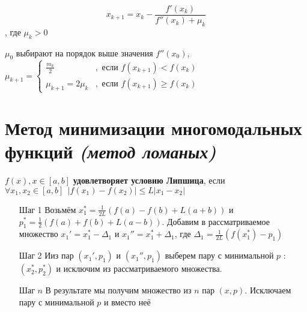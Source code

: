 \[x_{k+1} = x_k - \frac{f'(x_k)}{f''(x_k) + \mu_k} \]
, где \(\mu_k > 0\)

\(\mu_0\) выбирают на порядок выше значения \(f''(x_0)\), \(\mu_{k + 1} = \begin{cases} \frac{m_k}{2} & , \text{ если } f(x_{k+1}) < f(x_k) \\ \mu_{k+1} = 2 \mu_k & , \text{ если } f(x_{k+1}) \geq f(x_k) \end{cases}\)

\section{Метод минимизации многомодальных функций \textit{(метод ломаных)}}

\begin{definition}
    \(f(x), x\in[a, b]\) \textbf{удовлетворяет условию Липшица}, если \(\forall x_1, x_2\in[a, b] \ \ |f(x_1) - f(x_2)| \leq L |x_1 - x_2|\)
\end{definition}

\begin{itemize}
    \item [Шаг 1] Возьмём \(x_1^* = \frac{1}{2L}(f(a) - f(b) + L(a + b))\) и \(p_1^* = \frac{1}{2}(f(a) + f(b) + L(a - b))\). Добавим в рассматриваемое множество \(x_1' = x_1^* - \Delta_1\) и \(x_1'' = x_1^* + \Delta_1\), где \(\Delta_1 = \frac{1}{2L} (f(x_1^*) - p_1)\)
    \item [Шаг 2] Ииз пар \((x_1', p_1)\) и \((x_1'', p_1)\) выберем пару с минимальной \(p\) : \((x_2^*, p_2^*)\) и исключим из рассматриваемого множества.
    \item [Шаг \(n\)] В результате мы получим множество из \(n\) пар \((x, p)\). Исключаем пару с минимальной \(p\) и вместо неё
\end{itemize}

